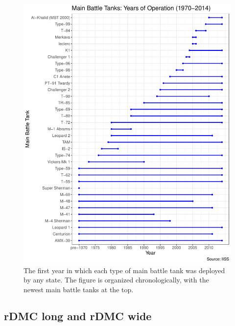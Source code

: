 \documentclass[
]{article}
\begin{document}
\begin{figure}[H]

{\centering \includegraphics{2021-10-05_rDMC_files/figure-latex/mbt-invention-1} 

}

\caption{The first year in which each type of main battle tank was deployed by any state. The figure is organized chronologically, with the newest main battle tanks at the top.}\label{fig:mbt-invention}
\end{figure}

\hypertarget{rdmc-long-and-rdmc-wide}{%
\subsection{rDMC long and rDMC wide}\label{rdmc-long-and-rdmc-wide}}
\end{document}
